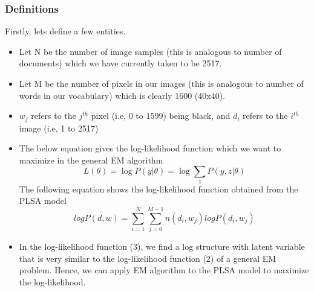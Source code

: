 \documentclass[10pt]{article}
\begin{document}
		\subsubsection{Definitions}
			Firstly, lets define a few entities. 
			\begin{itemize}
				\item 
				Let N be the number of image samples (this is analogous to number of documents) which we have currently taken to be 2517.
				\item
				Let M be the number of pixels in our images (this is analogous to number of words in our vocabulary) which is clearly 1600 (40x40).
				\item
				$w_j$ refers to the $j^{th}$ pixel (i.e, 0 to 1599) being black, and $d_i$ refers to the $i^{th}$
				image (i.e, 1 to 2517)
				\item 
				The below equation gives the log-likelihood function which we want to maximize in the general EM algorithm
				\begin{equation} 
				L(\theta) = \log P(y|\theta) = \log \sum_{z} P({y,z}|\theta)
				\end{equation}
				The following equation \cite{hoff2} shows the log-likelihood function obtained from the PLSA model
				\begin{equation}
					log P(d,w) = \sum_{i=1}^{N}\sum_{j=0}^{M-1}n(d_i,w_j)log P(d_i,w_j)
				\end{equation}
				\item
				In the log-likelihood function (3), we find a log structure with latent variable that is very similar to the log-likelihood function (2) of a general EM problem. Hence, we can apply EM algorithm to the PLSA model to maximize the log-likelihood.
			\end{itemize}
\end{document}
